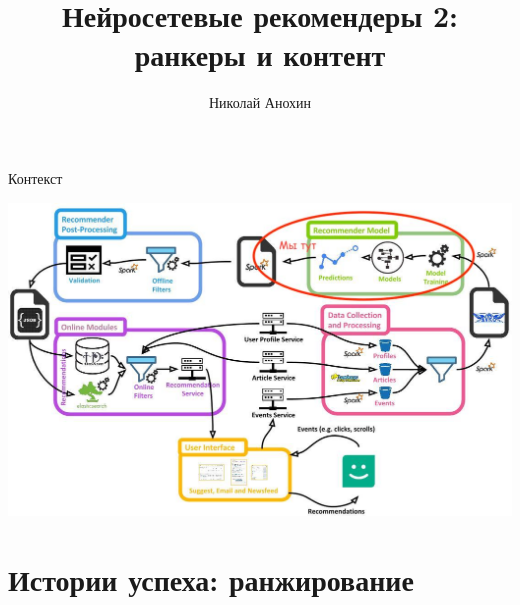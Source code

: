 \documentclass[11pt,aspectratio=169,handout]{beamer}
\author{Николай Анохин}
\title{Нейросетевые рекомендеры 2: \\ ранкеры и контент}
\begin{document}
{

\begin{frame}
\titlepage
\end{frame}


}

\begin{frame}{Контекст}

\begin{center}
\includegraphics[scale=0.23]{images/mendeley.jpeg}
\end{center}

\end{frame}


\section{Истории успеха: ранжирование}
\end{document}

